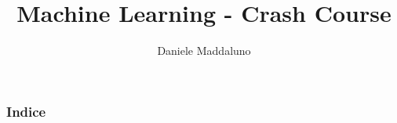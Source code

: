 \documentclass{beamer}
\title{Machine Learning - Crash Course}
\author{Daniele Maddaluno}
\date{\academicyear}
\begin{document}
\begin{frame}
	\titlepage %
\end{frame}

\begin{frame}[allowframebreaks]
	\frametitle{Indice} %
	\tableofcontents %
\end{frame}
 









\end{document}
